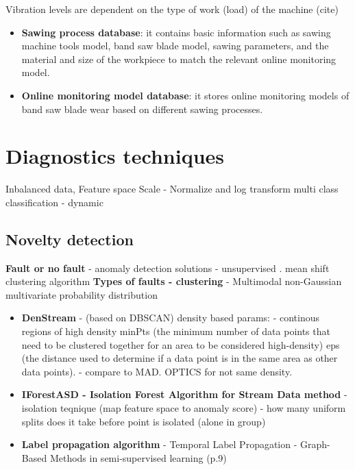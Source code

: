 Vibration levels are dependent on the type of work (load) of the machine (cite)
\begin{itemize}
\item \textbf{Sawing process database}: it contains basic information such as sawing machine tools model, band saw blade model, sawing parameters, and the material and size of the workpiece to match the relevant online monitoring model.
\item \textbf{Online monitoring model database}: it stores online monitoring models of band saw blade wear based on different sawing processes.
\end{itemize}










\section{Diagnostics techniques}
Inbalanced data, Feature space
Scale  -  Normalize and log transform
multi class classification - dynamic 


\subsection{Novelty detection}
\textbf{Fault or no fault} - anomaly detection solutions - unsupervised \cite{torres_automatic_2022}. mean shift clustering algorithm
\textbf{Types of faults - clustering} - Multimodal non-Gaussian multivariate probability distribution

\begin{itemize}
\item \textbf{DenStream} - (based on DBSCAN)  density based params: - continous regions of high density
	minPts (the minimum number of data points that need to be clustered together for an area to be considered high-density)
	eps (the distance used to determine if a data point is in the same area as other data points). - compare to MAD. OPTICS for not same density.
\item \textbf{IForestASD - Isolation Forest Algorithm for Stream Data method} - isolation teqnique (map feature space to anomaly score) - how many uniform splits does it take before point is isolated (alone in group)
\item \textbf{Label propagation algorithm} - Temporal Label Propagation - Graph-Based Methods in semi-supervised learning (p.9)
\end{itemize}




